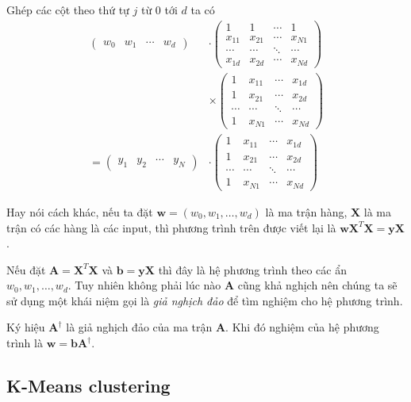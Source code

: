 Ghép các cột theo thứ tự $j$ từ 0 tới $d$ ta có
\begin{align*}
    \begin{pmatrix}
        w_0 & w_1 & \cdots & w_d
    \end{pmatrix} & \cdot \begin{pmatrix}
        1 & 1 & \cdots & 1 \\ x_{11} & x_{21} & \cdots & x_{N1} \\ \cdots & \cdots & \ddots & \cdots \\ x_{1d} & x_{2d} & \cdots & x_{Nd}
    \end{pmatrix} \\ & \times \begin{pmatrix}
        1 & x_{11} & \cdots & x_{1d} \\ 1 & x_{21} & \cdots & x_{2d} \\ \cdots & \cdots & \ddots & \cdots \\ 1 & x_{N1} & \cdots & x_{Nd}
    \end{pmatrix} \\ = \begin{pmatrix}
        y_1 & y_2 & \cdots & y_N
    \end{pmatrix} & \cdot \begin{pmatrix}
        1 & x_{11} & \cdots & x_{1d} \\ 1 & x_{21} & \cdots & x_{2d} \\ \cdots & \cdots & \ddots & \cdots \\ 1 & x_{N1} & \cdots & x_{Nd}
    \end{pmatrix}
\end{align*}

Hay nói cách khác, nếu ta đặt $\bm{w} = (w_0, w_1, \ldots, w_d)$ là ma trận hàng, $\bm{X}$ là ma trận có các hàng là các input, thì phương trình trên được viết lại là $\bm{w} \bm{X}^T \bm{X} = \bm{y} \bm{X}$.

Nếu đặt $\bm{A} = \bm{X}^T \bm{X}$ và $\bm{b} = \bm{y} \bm{X}$ thì đây là hệ phương trình theo các ẩn $w_0, w_1, \ldots, w_d$. Tuy nhiên không phải lúc nào $\bm{A}$ cũng khả nghịch nên chúng ta sẽ sử dụng một khái niệm gọi là \textit{giả nghịch đảo} để tìm nghiệm cho hệ phương trình.

Ký hiệu $\bm{A}^\dag$ là giả nghịch đảo của ma trận $\bm{A}$. Khi đó nghiệm của hệ phương trình là $\bm{w} = \bm{b} \bm{A}^\dag$.

\subsection*{K-Means clustering}

